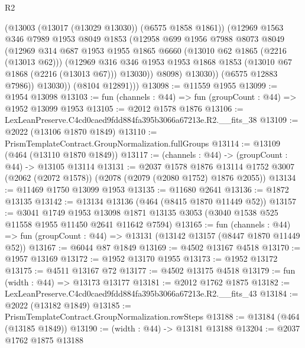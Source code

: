 \begin{lexlean}{R2}
\begin{coremodule}
                (@13003 (@13017 (@13029 @13030)) (@6575 @1858 @1861))
                (@12969
                  @1563
                  @346
                  @7989
                  @1953
                  @8049
                  @1853
                  (@12958
                    @699
                    @1956
                    @7988
                    @8073
                    @8049
                    (@12969
                      @314
                      @687
                      @1953
                      @1955
                      @1865
                      @6660
                      (@13010 @62 @1865 (@2216 (@13013 @62)))
                      (@12969
                        @316
                        @346
                        @1953
                        @1953
                        @1868
                        @1853
                        (@13010 @67 @1868 (@2216 (@13013 @67)))
                        @13030))
                    @8098)
                  @13030))
              (@6575 @12883 @7986))
            @13030))
        (@8104 @12891)))
@13098 := @11559 @1955
@13099 := @1954 @13098
@13103 := fun (channels : @44) => fun (groupCount : @44) => @1952 @13099 @1953
@13105 := @2012 @1578 @1876
@13106 := LexLeanPreserve.C4cd0caed9fdd884fa395b3066a67213e.R2.__fits_38
@13109 := @2022 (@13106 @1870 @1849)
@13110 := PrismTemplateContract.GroupNormalization.fullGroups
@13114 := @13109 (@464 (@13110 @1870 @1849))
@13117 := (channels : @44) -> (groupCount : @44) -> @13105 @13114
@13131 := @2037
    @1578
    @1876
    @13114
    @1752
    @3007
    (@2062 (@2072 @1578))
    (@2078 (@2079 (@2080 @1752) @1876 @2055))
@13134 := @11469 @1750 @13099 @1953
@13135 := @11680 @2641
@13136 := @1872 @13135
@13142 := @13134 @13136 (@464 (@8415 @1870 @11449 @52))
@13157 := @3041
    @1749
    @1953
    @13098
    @1871
    @13135
    @3053
    (@3040 @1538 @525 @11558 @1955 @11450 @2641 @11642 @7594)
@13165 := fun (channels : @44) =>
  fun (groupCount : @44) => @13131 (@13142 @13157 (@8447 @1870 @11449 @52))
@13167 := @6044 @87 @1849
@13169 := @4502 @13167 @4518
@13170 := @1957 @13169
@13172 := @1952 @13170 @1955
@13173 := @1952 @13172
@13175 := @4511 @13167 @72
@13177 := @4502 @13175 @4518
@13179 := fun (width : @44) => @13173 @13177
@13181 := @2012 @1762 @1875
@13182 := LexLeanPreserve.C4cd0caed9fdd884fa395b3066a67213e.R2.__fits_43
@13184 := @2022 (@13182 @1849)
@13185 := PrismTemplateContract.GroupNormalization.rowSteps
@13188 := @13184 (@464 (@13185 @1849))
@13190 := (width : @44) -> @13181 @13188
@13204 := @2037
    @1762
    @1875
    @13188

\end{coremodule}
\end{lexlean}
